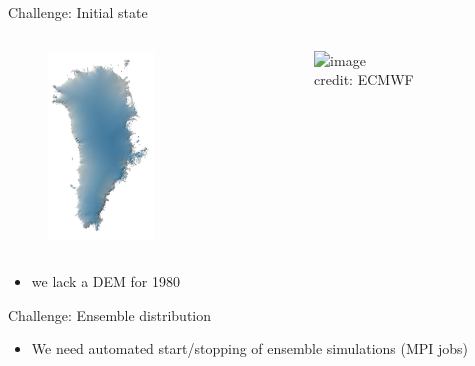 \documentclass[hide notes,intlimits]{beamer}
\begin{document}
\begin{frame}{Challenge: Initial state}
  \begin{columns}[c]
    \begin{column}{.35\textwidth}
      \begin{figure}
        \includegraphics[height=5cm]{gris-surface-dem}
      \end{figure}
    \end{column}
    \begin{column}{.6\textwidth}
  \begin{figure}
  \includegraphics<1>[width=6cm]{initial-state-ensemble} \\
    \tiny{credit: ECMWF}
  \end{figure}
    \end{column}
  \end{columns}
  \begin{itemize}
    \item we lack a DEM for 1980
  \end{itemize}

\end{frame}


\begin{frame}{Challenge: Ensemble distribution}
  \begin{itemize}
    \item We need automated start/stopping of ensemble simulations (MPI jobs)
  \end{itemize}

\end{frame}


  
  {
}

\begin{frame}{}
\end{frame}
\end{document}

